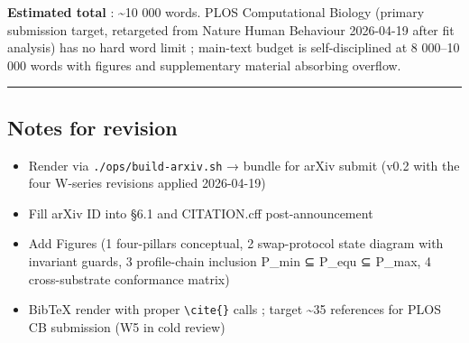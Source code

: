 \documentclass[
]{article}
\providecommand{\tightlist}{%
  \setlength{\itemsep}{0pt}\setlength{\parskip}{0pt}}
\begin{document}
\textbf{Estimated total} : \textasciitilde10 000 words. PLOS
Computational Biology (primary submission target, retargeted from Nature
Human Behaviour 2026-04-19 after fit analysis) has no hard word limit ;
main-text budget is self-disciplined at 8 000--10 000 words with figures
and supplementary material absorbing overflow.

\begin{center}\rule{0.5\linewidth}{0.5pt}\end{center}

\subsection{Notes for revision}\label{notes-for-revision}

\begin{itemize}
\tightlist
\item
  Render via \texttt{./ops/build-arxiv.sh} → bundle for arXiv submit
  (v0.2 with the four W-series revisions applied 2026-04-19)
\item
  Fill arXiv ID into §6.1 and CITATION.cff post-announcement
\item
  Add Figures (1 four-pillars conceptual, 2 swap-protocol state diagram
  with invariant guards, 3 profile-chain inclusion P\_min ⊆ P\_equ ⊆
  P\_max, 4 cross-substrate conformance matrix)
\item
  BibTeX render with proper \texttt{\textbackslash{}cite\{\}} calls ;
  target \textasciitilde35 references for PLOS CB submission (W5 in cold
  review)
\end{itemize}
\end{document}
